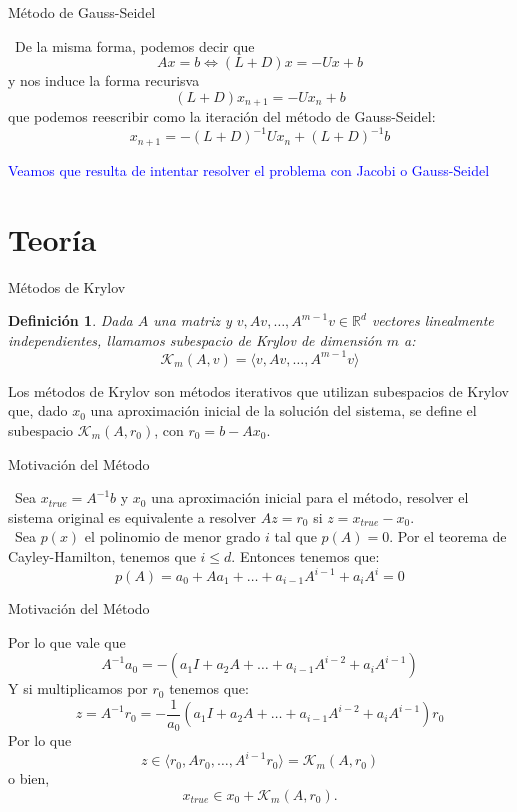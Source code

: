 \documentclass[12pt]{beamer}
\newtheorem*{defs}{Definición}
\begin{document}
	\begin{frame}{Método de Gauss-Seidel}
		
		\ De la misma forma, podemos decir que $$Ax=b \iff (L+D)x=-Ux+b$$ y nos induce la forma recurisva $$(L+D)x_{n+1}=-Ux_n+b$$ que podemos reescribir como la iteración del método de Gauss-Seidel: $$x_{n+1}=-(L+D)^{-1}Ux_n+(L+D)^{-1}b$$
	\end{frame}
	
	\begin{frame}
		
		\textcolor{blue}{\Large Veamos que resulta de intentar resolver el problema con Jacobi o Gauss-Seidel}
		
	\end{frame}
	
	\section{Teoría}
	
	\begin{frame}{Métodos de Krylov}
		
		\begin{defs}
			Dada $A$ una matriz y $v, Av, \dots , A^{m-1}v \in \mathbb{R}^d$ vectores linealmente independientes, llamamos subespacio de Krylov de dimensión $m$ a: $$\mathcal{K}_{m}(A, v) = \langle v, Av, \ldots, A^{m-1}v \rangle$$
		\end{defs} 
		Los métodos de Krylov son métodos iterativos que utilizan subespacios de Krylov que, dado $x_0$ una aproximación inicial de la solución del sistema, se define el subespacio $\mathcal{K}_{m}(A, r_0)$, con $r_0=b-Ax_0$.
		
	\end{frame}
	
	\begin{frame}{Motivación del Método}
		
		\ Sea $x_{true}=A^{-1}b$ y $x_0$ una aproximación inicial para el método, resolver el sistema original es equivalente a resolver $Az=r_0$ si $z=x_{true}-x_0$. \\ \ Sea $p(x)$ el polinomio de menor grado $i$ tal que $p(A)=0$. Por el teorema de Cayley-Hamilton, tenemos que $i\leq d$. Entonces tenemos que: $$p(A)=a_0+Aa_1+\dots+a_{i-1}A^{i-1}+a_iA^i=0$$ 
		
	\end{frame}
	
	\begin{frame}{Motivación del Método}
		
		Por lo que vale que $$A^{-1}a_0=-(a_1I+a_2A+\dots+a_{i-1}A^{i-2}+a_iA^{i-1})$$ Y si multiplicamos por $r_0$ tenemos que: $$z=A^{-1}r_0=-\frac{1}{a_0}(a_1I+a_2A+\dots+a_{i-1}A^{i-2}+a_iA^{i-1})r_0$$ Por lo que $$z\in \langle r_0,Ar_0,\dots,A^{i-1}r_0 \rangle = \mathcal{K}_{m}(A, r_0)$$ o bien, $$x_{true} \in x_0 + \mathcal{K}_{m}(A, r_0).$$
		
	\end{frame}
	
\end{document}

